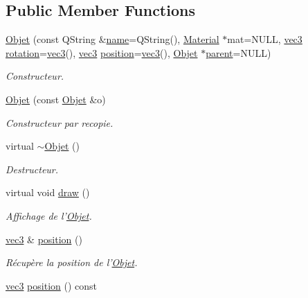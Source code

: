 \subsection*{Public Member Functions}
\begin{DoxyCompactItemize}
\item 
\hyperlink{class_objet_aea29e90dc963beb399d3028b7322039f}{Objet} (const Q\+String \&\hyperlink{class_objet_a4a702c189bedcbf1e65da6aec72c8e44}{name}=Q\+String(), \hyperlink{class_material}{Material} $\ast$mat=N\+U\+L\+L, \hyperlink{structvec3}{vec3} \hyperlink{class_objet_ac69a1b459bcb4433099c8cfbff06b209}{rotation}=\hyperlink{structvec3}{vec3}(), \hyperlink{structvec3}{vec3} \hyperlink{class_objet_a0e109bc790b14328202dd2546b04e2fd}{position}=\hyperlink{structvec3}{vec3}(), \hyperlink{class_objet}{Objet} $\ast$\hyperlink{class_objet_a95e63a98dc9dc485fe874df30f2069ee}{parent}=N\+U\+L\+L)
\begin{DoxyCompactList}\small\item\em Constructeur. \end{DoxyCompactList}\item 
\hyperlink{class_objet_aeaf99767deb7996bd323185ba22e8ca1}{Objet} (const \hyperlink{class_objet}{Objet} \&o)
\begin{DoxyCompactList}\small\item\em Constructeur par recopie. \end{DoxyCompactList}\item 
virtual \hyperlink{class_objet_a77a195bb1452ef4221b5080632cd7757}{$\sim$\+Objet} ()
\begin{DoxyCompactList}\small\item\em Destructeur. \end{DoxyCompactList}\item 
virtual void \hyperlink{class_objet_a5cc323f562964e00b947b2d908e206e7}{draw} ()
\begin{DoxyCompactList}\small\item\em Affichage de l'\hyperlink{class_objet}{Objet}. \end{DoxyCompactList}\item 
\hyperlink{structvec3}{vec3} \& \hyperlink{class_objet_a0e109bc790b14328202dd2546b04e2fd}{position} ()
\begin{DoxyCompactList}\small\item\em Récupère la position de l'\hyperlink{class_objet}{Objet}. \end{DoxyCompactList}\item 
\hyperlink{structvec3}{vec3} \hyperlink{class_objet_a79051e09eb1aa72dcd338ed033e9f3f1}{position} () const 

\end{DoxyCompactItemize}
